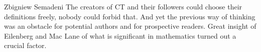 \begin{artengenv}{Zbigniew Semadeni}
The creators of CT and their followers could choose their definitions freely, nobody 
could forbid that. And yet the previous way of thinking was an obstacle for 
potential authors and for prospective readers. Great insight of Eilenberg and 
Mac Lane of what is significant in mathematics turned out a crucial factor.  



\end{artengenv}